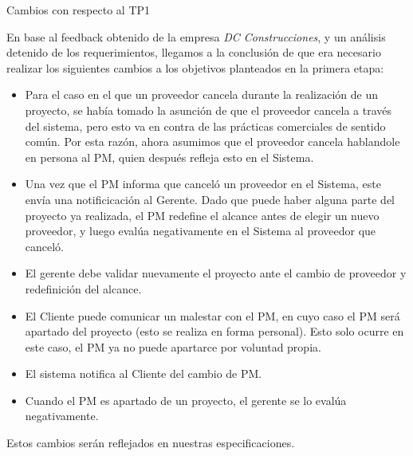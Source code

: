 Cambios con respecto al TP1

En base al feedback obtenido de la empresa \textit{DC Construcciones}, y un análisis detenido de los requerimientos, llegamos a la conclusión de que era necesario realizar los siguientes cambios a los objetivos planteados en la primera etapa:

\begin{itemize}
  \item Para el caso en el que un proveedor cancela durante la realización de un proyecto, se había tomado la asunción de que el proveedor cancela a través del sistema, pero esto va en contra de las prácticas comerciales de sentido común. Por esta razón, ahora asumimos que el proveedor cancela hablandole en persona al PM, quien después refleja esto en el Sistema.
  \item Una vez que el PM informa que canceló un proveedor en el Sistema, este envía una notificicación al Gerente. Dado que puede haber alguna parte del proyecto ya realizada, el PM redefine el alcance antes de elegir un nuevo proveedor, y luego evalúa negativamente en el Sistema al proveedor que canceló.
  \item El gerente debe validar nuevamente el proyecto ante el cambio de proveedor y redefinición del alcance.
  \item El Cliente puede comunicar un malestar con el PM, en cuyo caso el PM será apartado del proyecto (esto se realiza en forma personal). Esto solo ocurre en este caso, el PM ya no puede apartarce por voluntad propia.
  \item El sistema notifica al Cliente del cambio de PM.
  \item Cuando el PM es apartado de un proyecto, el gerente se lo evalúa negativamente.
\end{itemize}

Estos cambios serán reflejados en nuestras especificaciones.

